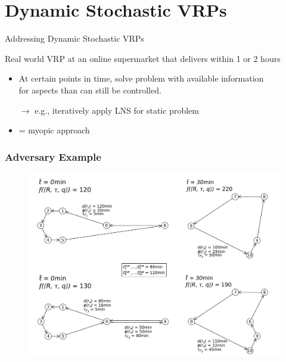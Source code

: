 \documentclass[aspectratio=1610]{beamer}
\newcommand{\important}[1]{{\color{green!60!black}#1}}
\begin{document}
\section{Dynamic Stochastic VRPs}

\begin{frame}{Addressing Dynamic Stochastic VRPs}


\bigskip
{} \important{Real world VRP} at an online supermarket that \important{delivers within 1 or 2 hours}

\bigskip
{}

\begin{itemize}
	\itemsep2ex
	\item At certain points in time, solve problem with available information\\ for aspects than can still be controlled.
	
	\item[$\rightarrow$] e.g., iteratively apply LNS for static problem
	\item = \important{myopic approach}
\end{itemize}

\end{frame}

\begin{frame}
	\frametitle{Adversary Example}
	\begin{figure}[tb]
		\centering
		\includegraphics[width=.80\columnwidth]{graphics/illustrative_example_corrected.pdf}
	\end{figure}
\end{frame}
\end{document}
